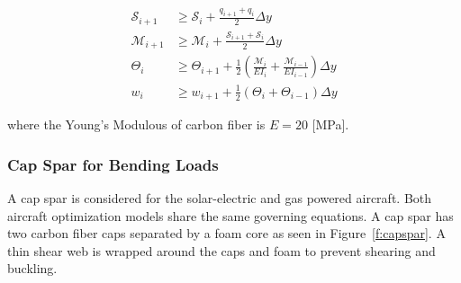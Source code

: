 % 
% 
%  

\begin{align}
    \label{e:sheargp}
    \mathcal{S}_{i+1} &\geq \mathcal{S}_i + \frac{q_{i+1} + q_i}{2} \Delta y \\
    \label{e:momentgp}
    \mathcal{M}_{i+1} &\geq \mathcal{M}_i + \frac{\mathcal{S}_{i+1} + \mathcal{S}_i}{2} \Delta y \\
    \label{e:anglegp}
    \Theta_{i} &\geq \Theta_{i+1} + \frac{1}{2} \left(\frac{\mathcal{M}_i}{EI_i} + \frac{\mathcal{M}_{i-1}}{EI_{i-1}} \right) \Delta y \\
    \label{e:deflection}
    w_{i} &\geq w_{i+1} + \frac{1}{2} (\Theta_i + \Theta_{i-1}) \Delta y 
\end{align}

where the Young's Modulous of carbon fiber is $E = 20$ [MPa]. 

\subsubsection{Cap Spar for Bending Loads}

A cap spar is considered for the solar-electric and gas powered aircraft.  Both aircraft optimization models share the same governing equations.  A cap spar has two carbon fiber caps separated by a foam core as seen in Figure~\ref{f:capspar}. A thin shear web is wrapped around the caps and foam to prevent shearing and buckling.

